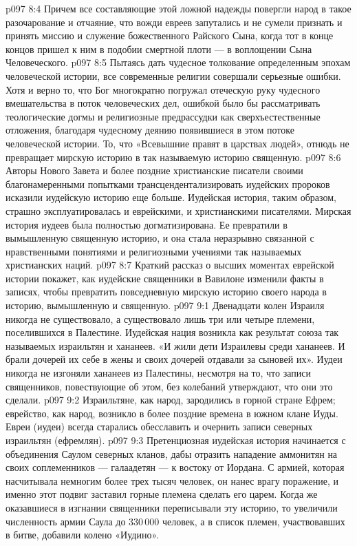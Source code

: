 \vs p097 8:4 Причем все составляющие этой ложной надежды повергли народ в такое разочарование и отчаяние, что вожди евреев запутались и не сумели признать и принять миссию и служение божественного Райского Сына, когда тот в конце концов пришел к ним в подобии смертной плоти --- в воплощении Сына Человеческого.
\vs p097 8:5 \pc Пытаясь дать чудесное толкование определенным эпохам человеческой истории, все современные религии совершали серьезные ошибки. Хотя и верно то, что Бог многократно погружал отеческую руку чудесного вмешательства в поток человеческих дел, ошибкой было бы рассматривать теологические догмы и религиозные предрассудки как сверхъестественные отложения, благодаря чудесному деянию появившиеся в этом потоке человеческой истории. То, что «Всевышние правят в царствах людей», отнюдь не превращает мирскую историю в так называемую историю священную.
\vs p097 8:6 Авторы Нового Завета и более поздние христианские писатели своими благонамеренными попытками трансцендентализировать иудейских пророков исказили иудейскую историю еще больше. Иудейская история, таким образом, страшно эксплуатировалась и еврейскими, и христианскими писателями. Мирская история иудеев была полностью догматизирована. Ее превратили в вымышленную священную историю, и она стала неразрывно связанной с нравственными понятиями и религиозными учениями так называемых христианских наций.
\vs p097 8:7 \pc Краткий рассказ о высших моментах еврейской истории покажет, как иудейские священники в Вавилоне изменили факты в записях, чтобы превратить повседневную мирскую историю своего народа в историю, вымышленную и священную.
\vs p097 9:1 Двенадцати колен Израиля никогда не существовало, а существовало лишь три или четыре племени, поселившихся в Палестине. Иудейская нация возникла как результат союза так называемых израильтян и хананеев. «И жили дети Израилевы среди хананеев. И брали дочерей их себе в жены и своих дочерей отдавали за сыновей их». Иудеи никогда не изгоняли хананеев из Палестины, несмотря на то, что записи священников, повествующие об этом, без колебаний утверждают, что они это сделали.
\vs p097 9:2 Израильтяне, как народ, зародились в горной стране Ефрем; еврейство, как народ, возникло в более поздние времена в южном клане Иуды. Евреи (иудеи) всегда старались обесславить и очернить записи северных израильтян (ефремлян).
\vs p097 9:3 \pc Претенциозная иудейская история начинается с объединения Саулом северных кланов, дабы отразить нападение аммонитян на своих соплеменников --- галаадетян --- к востоку от Иордана. С армией, которая насчитывала немногим более трех тысяч человек, он нанес врагу поражение, и именно этот подвиг заставил горные племена сделать его царем. Когда же оказавшиеся в изгнании священники переписывали эту историю, то увеличили численность армии Саула до 330\,000 человек, а в список племен, участвовавших в битве, добавили колено «Иудино».

